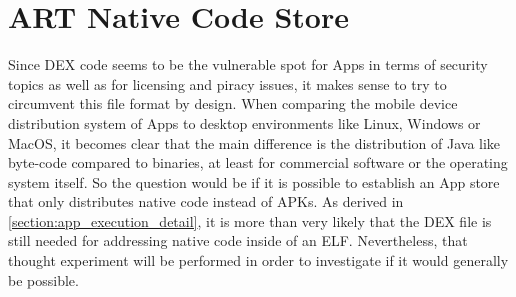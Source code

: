 \chapter{ART Native Code Store}\label{chapter:native_code_store}

Since DEX code seems to be the vulnerable spot for Apps in terms of security
topics as well as for licensing and piracy issues, it makes sense to try
to circumvent this file format by design.
When comparing the mobile device distribution
system of Apps to desktop environments like Linux, Windows or MacOS, it becomes clear that the main difference is the distribution of Java like byte-code compared to binaries, at least for commercial software or the operating system itself. So the question would be if it is possible to establish an App store that only distributes native code instead of APKs. As derived in \autoref{section:app_execution_detail}, it is more than very likely that the DEX file is still needed for addressing native code inside of an ELF.
Nevertheless, that thought experiment will be performed in order to investigate if it would generally be possible.


